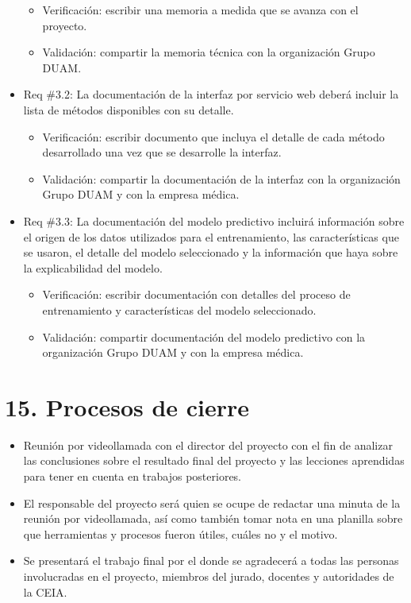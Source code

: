 \documentclass[
11pt, %
]{charter}
\begin{document}
\begin{itemize}
	\begin{itemize}
		\item Verificación: escribir una memoria a medida que se avanza con el proyecto.
		\item Validación: compartir la memoria técnica con la organización Grupo DUAM.
	\end{itemize}
	\item Req \#3.2: La documentación de la interfaz por servicio web deberá incluir la lista de métodos disponibles con su detalle.
	\begin{itemize}
		\item Verificación: escribir documento que incluya el detalle de cada método desarrollado una vez que se desarrolle la interfaz.
		\item Validación: compartir la documentación de la interfaz con la organización Grupo DUAM y con la empresa médica.
	\end{itemize}
	\item Req \#3.3: La documentación del modelo predictivo incluirá información sobre el origen de los datos utilizados para el entrenamiento, las características que se usaron, el detalle del modelo seleccionado y la información que haya sobre la explicabilidad del modelo.
	\begin{itemize}
		\item Verificación: escribir documentación con detalles del proceso de entrenamiento y características del modelo seleccionado.
		\item Validación: compartir documentación del modelo predictivo con la organización Grupo DUAM y con la empresa médica.
	\end{itemize}
\end{itemize}

\section{15. Procesos de cierre}    
\label{sec:cierre}

\begin{itemize}
	\item Reunión por videollamada con el director del proyecto con el fin de analizar las conclusiones sobre el resultado final del proyecto y las lecciones aprendidas para tener en cuenta en trabajos posteriores.
	\item El responsable del proyecto será quien se ocupe de redactar una minuta de la reunión por videollamada, así como también tomar nota en una planilla sobre que herramientas y procesos fueron útiles, cuáles no y el motivo.
	\item Se presentará el trabajo final por el \authorname\hspace{1px} donde se agradecerá a todas las personas involucradas en el proyecto, miembros del jurado, docentes y autoridades de la CEIA.
\end{itemize}
\end{document}
